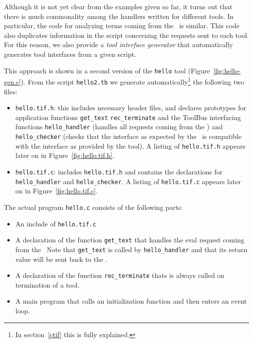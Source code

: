 \documentclass[a4,twoside,noweb]{article} %
\begin{document}
Although it is not yet clear from the examples given so far,
it turns out that there is much commonality among the handlers
written for different tools. In particular, the code for analyzing
terms coming from the \TB\ is similar. This code also duplicates
information in the script concerning the requests sent to each tool.
For this reason, we also provide a {\em tool interface generator}
that automatically generates tool interfaces from a given script.

This approach is shown in a second version of
the {\tt hello} tool (Figure~\ref{fig:hello-gen.c}).
From the script {\tt hello2.tb} we generate automatically\footnote{In
  section~\ref{ctif} this is fully explained.} the following two files:

\begin{itemize}
  
\item {\tt hello.tif.h}: this includes necessary header files, and declares
  prototypes for application functions {\tt get\_text} {\tt rec\_terminate} and
  the ToolBus interfacing functions {\tt hello\_handler} (handles all requests
  coming from the \TB) and {\tt hello\_checker} (checks that the interface as
  expected by the \TB\ is compatible with the interface as provided by the
  tool).  A listing of {\tt hello.tif.h} appears later on in
  Figure~\ref{fig:hello.tif.h}.

\item  {\tt hello.tif.c}: includes {\tt hello.tif.h} and contains the 
declarations for  {\tt hello\_handler} and {\tt hello\_checker}.
A listing of {\tt hello.tif.c} appears later on in Figure~\ref{fig:hello.tif.c}.

\end{itemize}

The actual program {\tt hello.c} consists of the following parts:
\begin{itemize}
\item An include of {\tt hello.tif.c}

\item A declaration of the function {\tt get\_text} that handles the
eval request coming from the \TB\ 
Note that {\tt get\_text} is called by {\tt hello\_handler} and that
its return value will be sent back to the \TB.

\item A declaration of the function {\tt rec\_terminate} thats is always
  called on termination of a tool.

\item A main program that calls an initialization function and
then enters an event loop.

\end{itemize}
\end{document}
